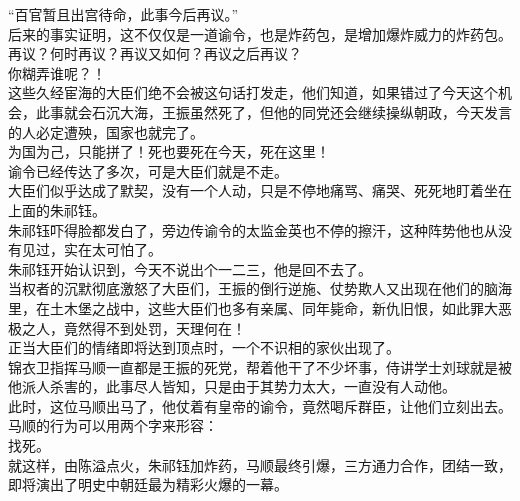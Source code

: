 \begin{multicols}{\theparacolNo}
“百官暂且出宫待命，此事今后再议。”\\

后来的事实证明，这不仅仅是一道谕令，也是炸药包，是增加爆炸威力的炸药包。\\

再议？何时再议？再议又如何？再议之后再议？\\

你糊弄谁呢？！\\

这些久经宦海的大臣们绝不会被这句话打发走，他们知道，如果错过了今天这个机会，此事就会石沉大海，王振虽然死了，但他的同党还会继续操纵朝政，今天发言的人必定遭殃，国家也就完了。\\

为国为己，只能拼了！死也要死在今天，死在这里！\\

谕令已经传达了多次，可是大臣们就是不走。\\

大臣们似乎达成了默契，没有一个人动，只是不停地痛骂、痛哭、死死地盯着坐在上面的朱祁钰。\\

朱祁钰吓得脸都发白了，旁边传谕令的太监金英也不停的擦汗，这种阵势他也从没有见过，实在太可怕了。\\

朱祁钰开始认识到，今天不说出个一二三，他是回不去了。\\

当权者的沉默彻底激怒了大臣们，王振的倒行逆施、仗势欺人又出现在他们的脑海里，在土木堡之战中，这些大臣们也多有亲属、同年毙命，新仇旧恨，如此罪大恶极之人，竟然得不到处罚，天理何在！\\

正当大臣们的情绪即将达到顶点时，一个不识相的家伙出现了。\\

锦衣卫指挥马顺一直都是王振的死党，帮着他干了不少坏事，侍讲学士刘球就是被他派人杀害的，此事尽人皆知，只是由于其势力太大，一直没有人动他。\\

此时，这位马顺出马了，他仗着有皇帝的谕令，竟然喝斥群臣，让他们立刻出去。\\

马顺的行为可以用两个字来形容：\\

找死。\\

就这样，由陈溢点火，朱祁钰加炸药，马顺最终引爆，三方通力合作，团结一致，即将演出了明史中朝廷最为精彩火爆的一幕。\\


\end{multicols}
